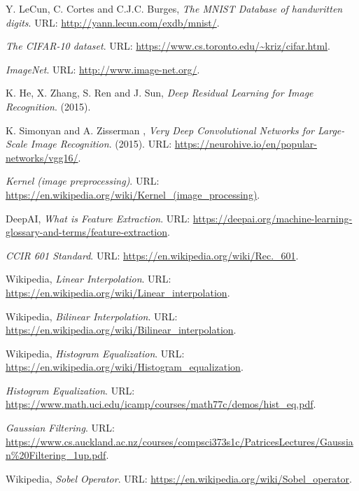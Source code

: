 
\begin{thebibliography}{3}
\frenchspacing

Y. LeCun, C. Cortes and C.J.C. Burges,
\emph{The MNIST Database of handwritten digits}.
URL: \url{http://yann.lecun.com/exdb/mnist/}.

\emph{The CIFAR-10 dataset}.
URL: \url{https://www.cs.toronto.edu/~kriz/cifar.html}.

\emph{ImageNet}.
URL: \url{http://www.image-net.org/}.

K. He, X. Zhang, S. Ren and J. Sun,
\emph{Deep Residual Learning for Image Recognition}.
(2015).

K. Simonyan and A. Zisserman
, \emph{Very Deep Convolutional Networks for Large-Scale Image Recognition}.
(2015).
URL: \url{https://neurohive.io/en/popular-networks/vgg16/}.

\emph{Kernel (image preprocessing)}.
URL: \url{https://en.wikipedia.org/wiki/Kernel_(image_processing)}.

DeepAI,
\emph{What is Feature Extraction}.
URL: \url{https://deepai.org/machine-learning-glossary-and-terms/feature-extraction}.

\emph{CCIR 601 Standard}.
URL: \url{https://en.wikipedia.org/wiki/Rec._601}.

Wikipedia,
\emph{Linear Interpolation}.
URL: \url{https://en.wikipedia.org/wiki/Linear_interpolation}.

Wikipedia,
\emph{Bilinear Interpolation}.
URL: \url{https://en.wikipedia.org/wiki/Bilinear_interpolation}.

Wikipedia,
\emph{Histogram Equalization}.
URL: \url{https://en.wikipedia.org/wiki/Histogram_equalization}.

\emph{Histogram Equalization}.
URL: \url{https://www.math.uci.edu/icamp/courses/math77c/demos/hist_eq.pdf}.

\emph{Gaussian Filtering}.
URL: \url{https://www.cs.auckland.ac.nz/courses/compsci373s1c/PatricesLectures/Gaussian%20Filtering_1up.pdf}.

Wikipedia,
\emph{Sobel Operator}.
URL: \url{https://en.wikipedia.org/wiki/Sobel_operator}.


\end{thebibliography}
